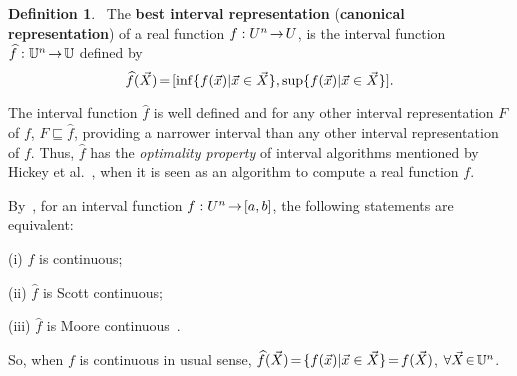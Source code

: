 \documentclass[conference]{IEEEtran}
\theoremstyle{plain}
\theoremstyle{remark}
\theoremstyle{definition}
\newtheorem{definition}[theorem]{Definition}
\theoremstyle{proposition}
\newcommand{\lra}{\hspace{-0.05cm}\rightarrow\hspace{-0.05cm}}
\begin{document}
\begin{definition}~\cite[Section 2]{SBA06}\label{d2}  The {\bf best interval representation} ({\bf canonical representation}) of a real function $f:U^n\lra U$, is the interval function
$\widehat{f}:{\mathbb{U}}^n\lra \mathbb{U}$ defined by\vspace{-0.2cm}
\begin{equation}\label{eq-br}\vspace{-0.1cm}
\widehat{f}(\vec{X})\hspace{-0.05cm}=\hspace{-0.05cm}[\inf \{f(\vec{x})|\vec{x} \in \vec{X}\}, \sup \{f(\vec{x})|\vec{x} \in \vec{X}\}].
\end{equation}
\end{definition}

The interval function $\widehat{f}$ is well defined and for any other interval representation $F$ of $f$, $F\sqsubseteq
\widehat{f}$, providing a narrower interval than any other interval representation of
$f$. Thus, $\widehat{f}$ has the \emph{optimality property} of interval algorithms mentioned by Hickey et
al.~\cite{Hic01}, when it is seen as an algorithm to compute a real function $f$.

By~\cite[Sect.~2.2]{SBA06}, for an interval function $f:U^n \lra [a,b]$, the following statements are equivalent:

(i) $f$ is continuous;

(ii) $\widehat{f}$ is Scott continuous;

(iii) $\widehat{f}$ is Moore continuous~\cite{SBA06}.

So, when $f$ is continuous in usual sense, $\widehat{f}(\vec{X})\hspace{-0.05cm}=\hspace{-0.05cm}\{f(\vec{x})|\vec{x}\in\vec{X}\}\hspace{-0.05cm}=\hspace{-0.05cm}f(\vec{X})$, $\forall \vec{X}\hspace{-0.05cm}\in\hspace{-0.05cm}{\mathbb{U}}^n$.


   

\end{document}
